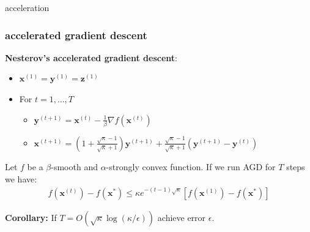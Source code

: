 \documentclass[compress]{beamer}
\newcommand{\bv}[1]{\mathbf{#1}}
\newcommand{\R}{\mathbb{R}}
\begin{document}
\begin{frame}[standout]
	\begin{center}
		\large acceleration
	\end{center}
\end{frame}


\begin{frame}
	\frametitle{accelerated gradient descent}
	\textbf{Nesterov's accelerated gradient descent}:
	\begin{itemize}
		\item $\bv{x}^{(1)} = \bv{y}^{(1)} = \bv{z}^{(1)}$  
		\item For $t = 1,\ldots, T$
		\begin{itemize}
			\item $\bv{y}^{(t+1)} = \bv{x}^{(t)} - \frac{1}{\beta}\nabla f(\bv{x}^{(t)})$
			\item $\bv{x}^{(t+1)} = \left(1 + \frac{\sqrt{\kappa} - 1}{\sqrt{\kappa} + 1}\right) \bv{y}^{(t+1)} + \frac{\sqrt{\kappa} - 1}{\sqrt{\kappa} + 1}\left(\bv{y}^{(t+1)} - \bv{y}^{(t)}\right)$
		\end{itemize}
	\end{itemize}
	\begin{theorem}
		Let $f$ be a $\beta$-smooth and $\alpha$-strongly convex function. If we run AGD for $T$ steps we have:
		\begin{align*}
			f(\bv{x}^{(t)}) - f(\bv{x}^*) \leq \kappa e^{-(t-1)\sqrt{\kappa}} \left[f(\bv{x}^{(1)}) - f(\bv{x}^*) \right]
		\end{align*} 
	\end{theorem}	
	\textbf{Corollary:} If \alert{$T = O\left(\sqrt{\kappa}\log(\kappa/\epsilon)\right)$ achieve error $\epsilon$.} 
	
\end{frame}
%
%		
%		
%		
%
\end{document}
